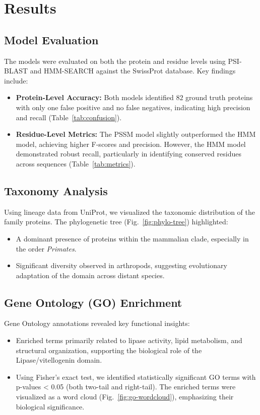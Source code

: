 
\section{Results}

\subsection{Model Evaluation}
The models were evaluated on both the protein and residue levels using PSI-BLAST and HMM-SEARCH against the SwissProt database. Key findings include:
\begin{itemize}
    \item \textbf{Protein-Level Accuracy:} Both models identified $82$ ground truth proteins with only one false positive and no false negatives, indicating high precision and recall (Table~\ref{tab:confusion}).
    \item \textbf{Residue-Level Metrics:} The PSSM model slightly outperformed the HMM model, achieving higher F-scores and precision. However, the HMM model demonstrated robust recall, particularly in identifying conserved residues across sequences (Table~\ref{tab:metrics}).
\end{itemize}

\subsection{Taxonomy Analysis}
Using lineage data from UniProt, we visualized the taxonomic distribution of the family proteins. The phylogenetic tree (Fig.~\ref{fig:phylo-tree}) highlighted:
\begin{itemize}
    \item A dominant presence of proteins within the mammalian clade, especially in the order \textit{Primates}.
    \item Significant diversity observed in arthropods, suggesting evolutionary adaptation of the domain across distant species.
\end{itemize}

\subsection{Gene Ontology (GO) Enrichment}
Gene Ontology annotations revealed key functional insights:
\begin{itemize}
    \item Enriched terms primarily related to lipase activity, lipid metabolism, and structural organization, supporting the biological role of the Lipase/vitellogenin domain.
    \item Using Fisher's exact test, we identified statistically significant GO terms with p-values < 0.05 (both two-tail and right-tail). The enriched terms were visualized as a word cloud (Fig.~\ref{fig:go-wordcloud}), emphasizing their biological significance.
\end{itemize}

